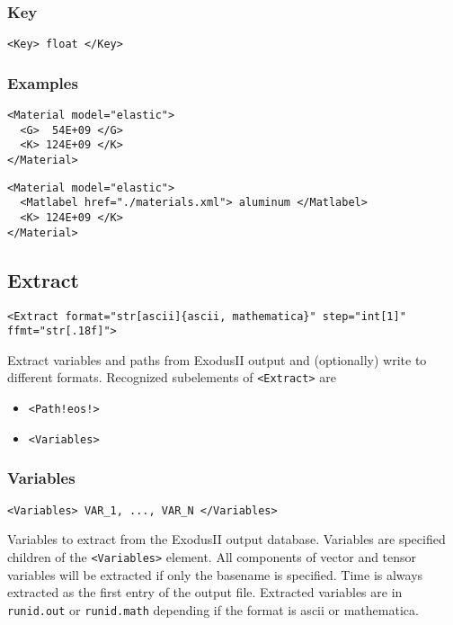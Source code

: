 \documentclass[11pt]{report}
\renewcommand{\tag}[1]{\texttt{<#1>}}
\newcommand{\sd}[1]{\texttt{!#1!}}
\begin{document}
\subsubsection{Key}
\begin{verbatim}
<Key> float </Key>
\end{verbatim}

\subsubsection{Examples}
\begin{verbatim}
<Material model="elastic">
  <G>  54E+09 </G>
  <K> 124E+09 </K>
</Material>
\end{verbatim}

\begin{verbatim}
<Material model="elastic">
  <Matlabel href="./materials.xml"> aluminum </Matlabel>
  <K> 124E+09 </K>
</Material>
\end{verbatim}

\subsection{Extract}
\begin{verbatim}
<Extract format="str[ascii]{ascii, mathematica}" step="int[1]" ffmt="str[.18f]">
\end{verbatim}
%
Extract variables and paths from ExodusII output and (optionally) write to
different formats. Recognized subelements of \tag{Extract} are
%
\begin{itemize}
  \item \tag{Path\sd{eos}}
  \item \tag{Variables}
\end{itemize}

\subsubsection{Variables}
\begin{verbatim}
<Variables> VAR_1, ..., VAR_N </Variables>
\end{verbatim}
%
Variables to extract from the ExodusII output database. Variables are specified
children of the \tag{Variables} element. All components of vector and tensor
variables will be extracted if only the basename is specified. Time is always
extracted as the first entry of the output file.  Extracted variables are in
\texttt{runid.out} or \texttt{runid.math} depending if the format is ascii or
mathematica.
\end{document}
